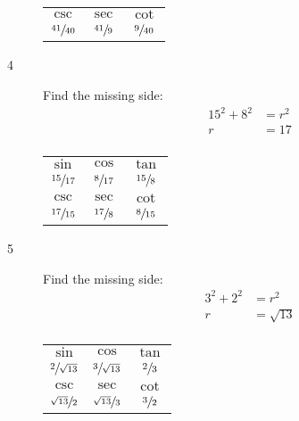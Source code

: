 \documentclass{exam}
\begin{document}
\begin{description}
\begin{tabular}[H]{ccc}
          \midrule

          $\csc$           & $\sec$          & $\cot$ \\
          $\sfrac{41}{40}$ & $\sfrac{41}{9}$ & $\sfrac{9}{40}$ \\

          \bottomrule
        \end{tabular}

      \item[4] 
        Find the missing side:
        \begin{align*}
          15^2 + 8^2 & = r^2 \\
          r          & = 17 \\
        \end{align*}

        \begin{tabular}[H]{ccc}
          \toprule

          $\sin$           & $\cos$          & $\tan$          \\
          $\sfrac{15}{17}$ & $\sfrac{8}{17}$ & $\sfrac{15}{8}$ \\

          \midrule

          $\csc$           & $\sec$          & $\cot$ \\
          $\sfrac{17}{15}$ & $\sfrac{17}{8}$ & $\sfrac{8}{15}$ \\

          \bottomrule
        \end{tabular}

      \item[5] 
        Find the missing side:
        \begin{align*}
          3^2 + 2^2 & = r^2 \\
          r         & = \sqrt{13} \\
        \end{align*}

        \begin{tabular}[H]{ccc}
          \toprule
          $\sin$                 & $\cos$                 & $\tan$         \\
          $\sfrac{2}{\sqrt{13}}$ & $\sfrac{3}{\sqrt{13}}$ & $\sfrac{2}{3}$ \\

          \midrule

          $\csc$                 & $\sec$                 & $\cot$ \\
          $\sfrac{\sqrt{13}}{2}$ & $\sfrac{\sqrt{13}}{3}$ & $\sfrac{3}{2}$ \\


\end{tabular}
\end{description}
\end{document}
